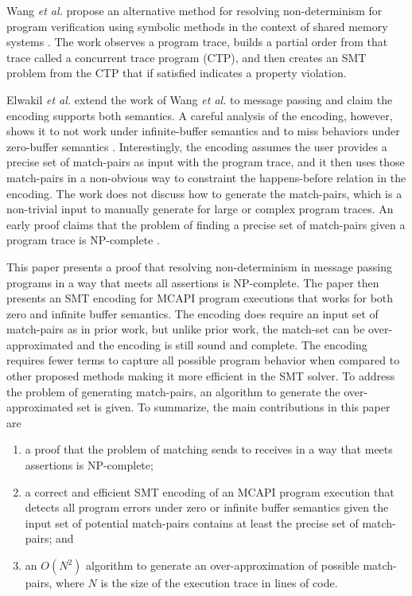 Wang \textit{et al.} propose an alternative method for resolving
non-determinism for program verification using symbolic methods in the context
of shared memory systems \cite{wang:fse09}. The work observes a
program trace, builds a partial order from that trace called a
concurrent trace program (CTP), and then creates an SMT problem from
the CTP that if satisfied indicates a property violation. 

Elwakil \textit{et al.} extend the work of Wang \textit{et al.} to
message passing and claim the encoding supports both semantics. A
careful analysis of the encoding, however, shows it to not work under
infinite-buffer semantics and to miss behaviors under zero-buffer
semantics \cite{elwakil:padtad10}. Interestingly, the encoding assumes
the user provides a precise set of match-pairs as input with the
program trace, and it then uses those match-pairs in a non-obvious way
to constraint the happens-before relation in the encoding. The work
does not discuss how to generate the match-pairs, which is a
non-trivial input to manually generate for large or complex program
traces. An early proof claims that the problem of finding a precise
set of match-pairs given a program trace is NP-complete
\cite{match-pair-np-complete}.

\examplefigone

 This paper presents a proof that resolving non-determinism in message
 passing programs in a way that meets all assertions is
 NP-complete. The paper then presents an SMT encoding for MCAPI
 program executions that works for both zero and infinite buffer
 semantics. The encoding does require an input set of match-pairs as
 in prior work, but unlike prior work, the match-set can be
 over-approximated and the encoding is still sound and complete. The
 encoding requires fewer terms to capture all possible program
 behavior when compared to other proposed methods making it more
 efficient in the SMT solver.  To address the problem of generating
 match-pairs, an algorithm to generate the over-approximated set is
 given. To summarize, the main contributions in this paper are

\begin{enumerate}
\item a proof that the problem of matching sends to receives in a way that meets assertions is NP-complete;
\item a correct and efficient SMT encoding of an MCAPI program
  execution that detects all program errors under zero or infinite
  buffer semantics given the input set of potential match-pairs
  contains at least the precise set of match-pairs; and
\item an $O(N^2)$ algorithm to generate an over-approximation of
  possible match-pairs, where $N$ is the size of the execution trace
  in lines of code.
\end{enumerate}


